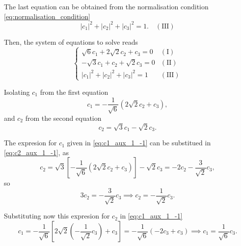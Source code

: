 The last equation can be obtained from the normalisation condition \cref{eq:normalisation_condition}
\begin{equation}
    \left| c_1 \right|^2 + 
    \left| c_2 \right|^2 +
    \left| c_3 \right|^2 = 1.
    \quad \left( \mathrm{III} \right)
\end{equation}

Then, the system of equations to solve reads 
\begin{equation}
    \begin{cases}
        \sqrt{6} c_1 + 2\sqrt{2} c_2 + c_3 = 0                                      & \left( \mathrm{I}   \right) \\
        -\sqrt{3} c_1 + c_2 + \sqrt{2} c_3 = 0                                      & \left( \mathrm{II}  \right) \\
        \left| c_1 \right|^2 + \left| c_2 \right|^2 + \left| c_3 \right|^2 = 1      & \left( \mathrm{III} \right)   
    \end{cases}
\end{equation}

Isolating $c_1$ from the first equation 
\begin{equation}\label{eq:c1_aux_1_-1_c3}
    c_1 =
    - \frac{1}{\sqrt{6}} \left( 2 \sqrt{2} c_2 + c_3 \right),
\end{equation}
and $c_2$ from the second equation 
\begin{equation}\label{eq:c2_aux_1_-1_c3}
    c_2 =
    \sqrt{3} c_1 - \sqrt{2} c_3.
\end{equation}

The expresion for $c_1$ given in \cref{eq:c1_aux_1_-1} can be substitued in \cref{eq:c2_aux_1_-1}, as 
\begin{equation}
    c_2 =
    \sqrt{3}
    \left[
        - \frac{1}{\sqrt{6}} \left( 2 \sqrt{2} c_2 + c_3 \right)
    \right]
    - \sqrt{2} c_3
    =
    -2 c_2 - \frac{3}{\sqrt{2}} c_3,
\end{equation}
so 
\begin{equation}\label{eq:c2_aux_1_-1}
    3 c_2 = 
    - \frac{3}{\sqrt{2}} c_3
    \implies
    c_2 = -\frac{1}{\sqrt{2}} c_3.
\end{equation}

Substituting now this expresion for $c_2$ in \cref{eq:c1_aux_1_-1} 
\begin{equation}\label{eq:c1_aux_1_-1}
    c_1 =
    - \frac{1}{\sqrt{6}} 
    \left[
        2 \sqrt{2} 
        \left( -\frac{1}{\sqrt{2}} c_3  \right)
        + c_3 
    \right]
    =
    - \frac{1}{\sqrt{6}} \left( -2 c_3 + c_3 \right)
    \implies
    c_1 =
    \frac{1}{\sqrt{6}} c_3.
\end{equation}

